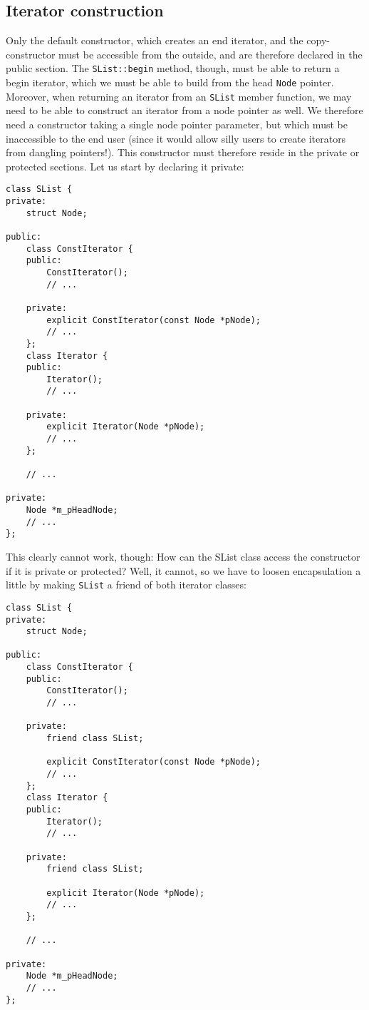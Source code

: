 \subsection{Iterator construction}
Only the default constructor, which creates an end iterator, and the copy-constructor must be accessible from the outside, and are therefore declared in the public section. The \lstinline!SList::begin! method, though, must be able to return a begin iterator, which we must be able to build from the head \lstinline!Node! pointer. Moreover, when returning an iterator from an \lstinline!SList! member function, we may need to be able to construct an iterator from a node pointer as well. We therefore need a constructor taking a single node pointer parameter, but which must be inaccessible to the end user (since it would allow silly users to create iterators from dangling pointers!). This constructor must therefore reside in the private or protected sections. Let us start by declaring it private:
\begin{lstlisting}[frame=single, caption={SList.h}]
class SList {
private:
    struct Node;

public:
    class ConstIterator {
    public:
        ConstIterator();
        // ...
        
    private:
        explicit ConstIterator(const Node *pNode);
        // ...
    };
    class Iterator {
    public:
        Iterator();
        // ...
        
    private:
        explicit Iterator(Node *pNode);
        // ...
    };
    
    // ...

private:
    Node *m_pHeadNode;
    // ...
};
\end{lstlisting}
This clearly cannot work, though: How can the SList class access the constructor if it is private or protected? Well, it cannot, so we have to loosen encapsulation a little by making \lstinline!SList! a friend of both iterator classes:
\begin{lstlisting}[frame=single, caption={SList.h}]
class SList {
private:
    struct Node;

public:
    class ConstIterator {
    public:
        ConstIterator();
        // ...
        
    private:
        friend class SList;
    
        explicit ConstIterator(const Node *pNode);
        // ...
    };
    class Iterator {
    public:
        Iterator();
        // ...
        
    private:
        friend class SList;
    
        explicit Iterator(Node *pNode);
        // ...
    };
    
    // ...

private:
    Node *m_pHeadNode;
    // ...
};
\end{lstlisting}
